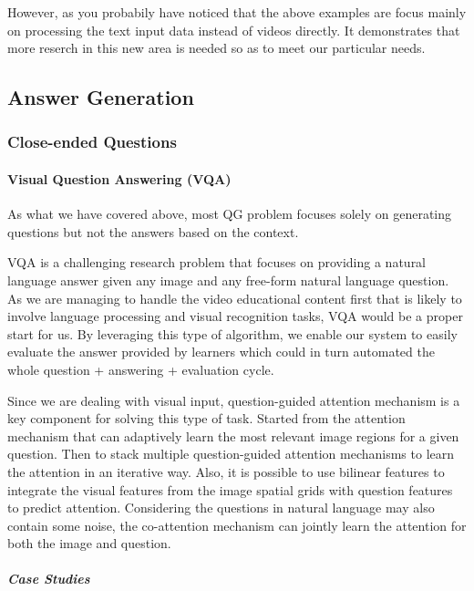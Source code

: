 \documentclass[]{book}
\let\oldparagraph\paragraph
\renewcommand{\paragraph}[1]{\oldparagraph{#1}\mbox{}}
\let\oldsubparagraph\subparagraph
\renewcommand{\subparagraph}[1]{\oldsubparagraph{#1}\mbox{}}
\theoremstyle{definition}
\theoremstyle{definition}
\theoremstyle{definition}
\theoremstyle{remark}
\begin{document}
However, as you probabily have noticed that the above examples are focus
mainly on processing the text input data instead of videos directly. It
demonstrates that more reserch in this new area is needed so as to meet
our particular needs.

\subsection{Answer Generation}\label{answer-generation}

\subsubsection{Close-ended Questions}\label{close-ended-questions}

\paragraph{Visual Question Answering
(VQA)}\label{visual-question-answering-vqa}

As what we have covered above, most QG problem focuses solely on
generating questions but not the answers based on the context.

VQA is a challenging research problem that focuses on providing a
natural language answer given any image and any free-form natural
language question. As we are managing to handle the video educational
content first that is likely to involve language processing and visual
recognition tasks, VQA would be a proper start for us. By leveraging
this type of algorithm, we enable our system to easily evaluate the
answer provided by learners which could in turn automated the whole
question + answering + evaluation cycle.

Since we are dealing with visual input, question-guided attention
mechanism is a key component for solving this type of task. Started from
the attention mechanism that can adaptively learn the most relevant
image regions for a given question. Then to stack multiple
question-guided attention mechanisms to learn the attention in an
iterative way. Also, it is possible to use bilinear features to
integrate the visual features from the image spatial grids with question
features to predict attention. Considering the questions in natural
language may also contain some noise, the co-attention mechanism can
jointly learn the attention for both the image and question.

\subparagraph{Case Studies}\label{case-studies-1}
\end{document}
